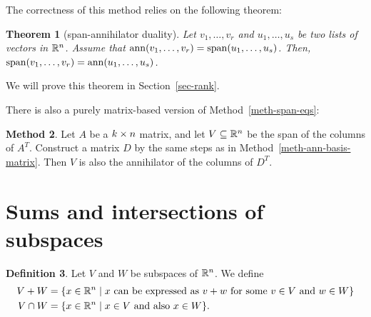 \documentclass[reqno]{amsart}
\newtheorem{theorem}{Theorem}[section]
\theoremstyle{definition}
\newtheorem{definition}[theorem]{Definition}
\newtheorem{method}[theorem]{Method}
\begin{document}
The correctness of this method relies on the following theorem:

\begin{theorem}[span-annihilator duality]\label{thm-ann-ann}
 Let $v_1, \ldots, v_r$ and $u_1, \ldots, u_s$ be two lists of vectors in ${\mathbb{R}}^n$.
 Assume that $\operatorname{ann}(v_1, \ldots, v_r) = \operatorname{span}(u_1,\ldots, u_s)$.
 Then, $\operatorname{span}(v_1, \ldots, v_r) = \operatorname{ann}(u_1,\ldots, u_s)$.
\end{theorem}

We will prove this theorem in Section~\ref{sec-rank}.

There is also a purely matrix-based version of Method~\ref{meth-span-eqs}:

\begin{method}\label{meth-span-eqs-matrix}
 Let $A$ be a $k\times n$ matrix, and let $V\subseteq{\mathbb{R}}^n$ be the span
 of the columns of $A^T$.  Construct a matrix $D$ by the same steps as
 in Method~\ref{meth-ann-basis-matrix}.  Then $V$ is also the annihilator of
 the columns of $D^T$.
\end{method}

\section{Sums and intersections of subspaces}
\label{sec-sum-meet}

\begin{definition}\label{defn-sum-meet}
 Let $V$ and $W$ be subspaces of ${\mathbb{R}}^n$.  We define
 \begin{align*}
  V+W &= \{x\in{\mathbb{R}}^n\;|\; x \text{ can be expressed as } v+w
            \text{ for some } v\in V \text{ and } w\in W\} \\
  V\cap W &= \{x\in{\mathbb{R}}^n\;|\; x\in V \text{ and also } x\in W\}.
 \end{align*}
\end{definition}
\end{document}
